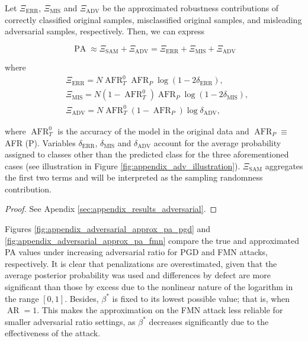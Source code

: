 \begin{theorem}
    Let $\Xi_{\text{ERR}}$, $\Xi_{\text{MIS}}$ and $\Xi_{\text{ADV}}$ be the approximated robustness
    contributions of correctly classified original samples, misclassified original samples,
    and misleading adversarial samples, respectively. Then, we can express

    $$
    \operatorname{PA} \approx \Xi_{\text{SAM}} + \Xi_{\text{ADV}} = \Xi_{\text{ERR}} + \Xi_{\text{MIS}} + \Xi_{\text{ADV}}
    $$

    where
    $$
    \begin{aligned}
        &\Xi_{\text{ERR}} = N \operatorname{AFR}_T^0 \operatorname{AFR}_P \log \left( 1 - 2\delta_{\text{ERR}} \right), \\
        &\Xi_{\text{MIS}} = N (1- \operatorname{AFR}_T^0) \operatorname{AFR}_P \log \left( 1 - 2\delta_{\text{MIS}} \right), \\
        &\Xi_{\text{ADV}} = N \operatorname{AFR}_T^0 (1 - \operatorname{AFR}_P) \log \delta_{\text{ADV}},
    \end{aligned}
    $$

    where $\operatorname{AFR}_T^0$ is the accuracy of the model in the original data and $\operatorname{AFR}_P \equiv$ AFR (P).
    Variables $\delta_{\text{ERR}}$, $\delta_{\text{MIS}}$ and $\delta_{\text{ADV}}$ account for the 
    average probability assigned to
    classes other than the predicted class for the three aforementioned cases 
    (see illustration in Figure \ref{fig:appendix_adv_illustration}). $\Xi_{\text{SAM}}$ aggregates
    the first two terms and will be interpreted as the sampling randomness contribution.
    \label{thm:approximated_pa}
\end{theorem}
\begin{proof}
    See Apendix \ref{sec:appendix_results_adversarial}.
\end{proof}

Figures \ref{fig:appendix_adversarial_approx_pa_pgd} and \ref{fig:appendix_adversarial_approx_pa_fmn}
compare the true and approximated PA values under increasing adversarial ratio for
PGD and FMN attacks, respectively. It is clear that penalizations are overestimated, 
given that the average posterior probability was
used and differences by defect are more significant than those by excess due to
the nonlinear nature of the logarithm in the range $[0,1]$.
Besides, $\beta^{*}$ is fixed to its lowest possible value; that
is, when $\operatorname{AR} = 1$. This makes the approximation on the FMN attack less
reliable for smaller adversarial ratio settings, as $\beta^{*}$ decreases significantly
due to the effectiveness of the attack. \\

